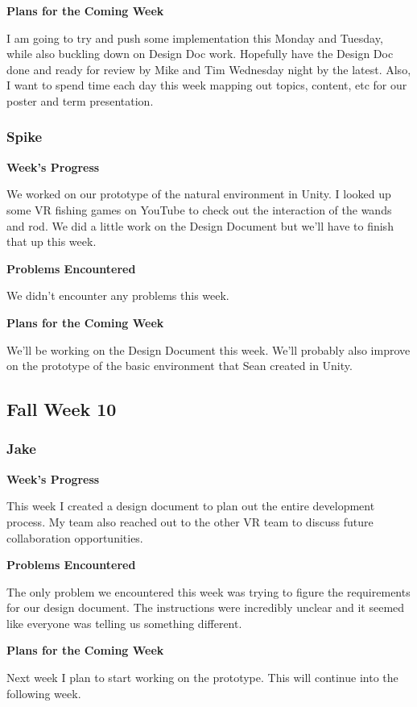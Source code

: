 \documentclass[10pt,journal,compsoc,onecolumn, draftclsnofoot]{IEEEtran}
\begin{document}
\noindent \textbf{Plans for the Coming Week}

I am going to try and push some implementation this Monday and Tuesday, while also buckling down on Design Doc work.  Hopefully have the Design Doc done and ready for review by Mike and Tim Wednesday night by the latest. Also, I want to spend time each day this week mapping out topics, content, etc for our poster and term presentation.

\subsubsection{Spike}
\noindent \textbf{Week's Progress}

We worked on our prototype of the natural environment in Unity. I looked up some VR fishing games on YouTube to check out the interaction of the wands and rod. We did a little work on the Design Document but we'll have to finish that up this week.

\noindent \textbf{Problems Encountered}

We didn't encounter any problems this week.

\noindent \textbf{Plans for the Coming Week}

We'll be working on the Design Document this week. We'll probably also improve on the prototype of the basic environment that Sean created in Unity.

\subsection{Fall Week 10}
\subsubsection{Jake}
\noindent \textbf{Week's Progress}

This week I created a design document to plan out the entire development process. My team also reached out to the other VR team to discuss future collaboration opportunities.

\noindent \textbf{Problems Encountered}

The only problem we encountered this week was trying to figure the requirements for our design document. The instructions were incredibly unclear and it seemed like everyone was telling us something different.

\noindent \textbf{Plans for the Coming Week}

Next week I plan to start working on the prototype. This will continue into the following week.
\end{document}
